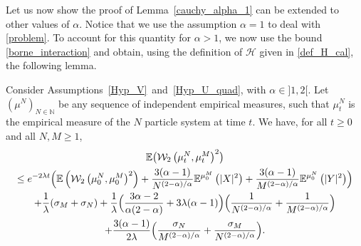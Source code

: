 Let us now show the proof of Lemma~\ref{cauchy_alpha_1} can be extended to other values of $\alpha$. Notice that we use the assumption $\alpha=1$ to deal with \eqref{problem}.
To account for this quantity for $\alpha>1$, we now use the bound \eqref{borne_interaction} and obtain, using the definition of $\mathcal{H}$ given in \eqref{def_H_cal}, the following lemma.

\begin{lemma}
Consider Assumptions~\ref{Hyp_V}~and~\ref{Hyp_U_quad}, with $\alpha\in{}]1,2[$. Let $(\mu^N)_{N\in\mathbb{N}}$ be any sequence of independent empirical measures, such that $\mu_t^N$ is the empirical measure of the $N$ particle system at time $t$. We have, for all $t\geq0$ and all $N,M\geq 1$,
\begin{multline}
\mathbb{E}\bigl(\mathcal{W}_2\left(\mu_t^N,\mu_t^M\right)^2\bigr)
\label{unif_sans_sup_2}\\
\leq e^{-2\lambda t}\Bigl(\mathbb{E}\left(\mathcal{W}_2\left(\mu_0^N,\mu_0^M\right)^2\right)+\frac{3(\alpha-1)}{N^{(2-\alpha)/\alpha}}\mathbb{E}^{\mu_0^M}\left(|X|^2\right)+\frac{3(\alpha-1)}{M^{(2-\alpha)/\alpha}}\mathbb{E}^{\mu_0^N}\left(|Y|^2\right)\Bigr)\\
+\frac{1}{\lambda}(\sigma_M+\sigma_N)+\frac{1}{\lambda}\Bigl(\frac{3\alpha-2}{\alpha(2-\alpha)}+3\lambda(\alpha-1)\Bigr)\Bigl(\frac{1}{N^{(2-\alpha)/\alpha}}+\frac{1}{M^{(2-\alpha)/\alpha}}\Bigr)\\
+\frac{3(\alpha-1)}{2\lambda}\Bigl(\frac{\sigma_N}{M^{(2-\alpha)/\alpha}}+\frac{\sigma_M}{N^{(2-\alpha)/\alpha}}\Bigr).
\end{multline}
\end{lemma}


